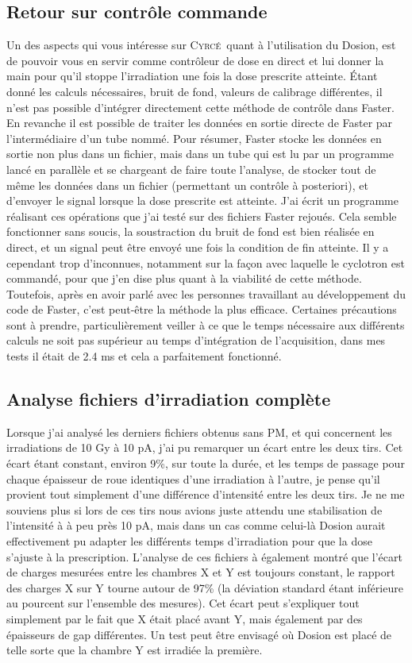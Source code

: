 \documentclass[a4paper,11pt]{article}
\newcommand{\cyrce}{\textsc{Cyrcé}}
\begin{document}
\subsection*{Retour sur contrôle commande}
Un des aspects qui vous intéresse sur \cyrce\ quant à l’utilisation du Dosion, est de pouvoir vous en servir comme contrôleur de dose en direct et lui donner la main pour qu’il stoppe l’irradiation une fois la dose prescrite atteinte.
Étant donné les calculs nécessaires, bruit de fond, valeurs de calibrage différentes, il n’est pas possible d’intégrer directement cette méthode de contrôle dans Faster. 
En revanche il est possible de traiter les données en sortie directe de Faster par l’intermédiaire d’un tube nommé. 
Pour résumer, Faster stocke les données en sortie non plus dans un fichier, mais dans un tube qui est lu par un programme lancé en parallèle et se chargeant de faire toute l’analyse, de stocker tout de même les données dans un fichier (permettant un contrôle à posteriori), et d’envoyer le signal lorsque la dose prescrite est atteinte.
J’ai écrit un programme réalisant ces opérations que j’ai testé sur des fichiers Faster rejoués. 
Cela semble fonctionner sans soucis, la soustraction du bruit de fond est bien réalisée en direct, et un signal peut être envoyé une fois la condition de fin atteinte.
Il y a cependant trop d’inconnues, notamment sur la façon avec laquelle le cyclotron est commandé, pour que j’en dise plus quant à la viabilité de cette méthode. 
Toutefois, après en avoir parlé avec les personnes travaillant au développement du code de Faster, c’est peut-être la méthode la plus efficace. 
Certaines précautions sont à prendre, particulièrement veiller à ce que le temps nécessaire aux différents calculs ne soit pas supérieur au temps d’intégration de l’acquisition, dans mes tests il était de 2.4 ms et cela a parfaitement fonctionné.

\subsection*{Analyse fichiers d'irradiation complète}
Lorsque j'ai analysé les derniers fichiers obtenus sans PM, et qui concernent les irradiations de 10 Gy à 10 pA, j'ai pu remarquer un écart entre les deux tirs.
Cet écart étant constant, environ 9\%, sur toute la durée, et les temps de passage pour chaque épaisseur de roue identiques d'une irradiation à l'autre, je pense qu'il provient tout simplement d'une différence d'intensité entre les deux tirs.
Je ne me souviens plus si lors de ces tirs nous avions juste attendu une stabilisation de l'intensité à à peu près 10 pA, mais dans un cas comme celui-là Dosion aurait effectivement pu adapter les différents temps d'irradiation pour que la dose s'ajuste à la prescription.
L'analyse de ces fichiers à également montré que l'écart de charges mesurées entre les chambres X et Y est toujours constant, le rapport des charges X sur Y tourne autour de 97\% (la déviation standard étant inférieure au pourcent sur l'ensemble des mesures).
Cet écart peut s'expliquer tout simplement par le fait que X était placé avant Y, mais également par des épaisseurs de gap différentes.
Un test peut être envisagé où Dosion est placé de telle sorte que la chambre Y est irradiée la première.
\end{document}
